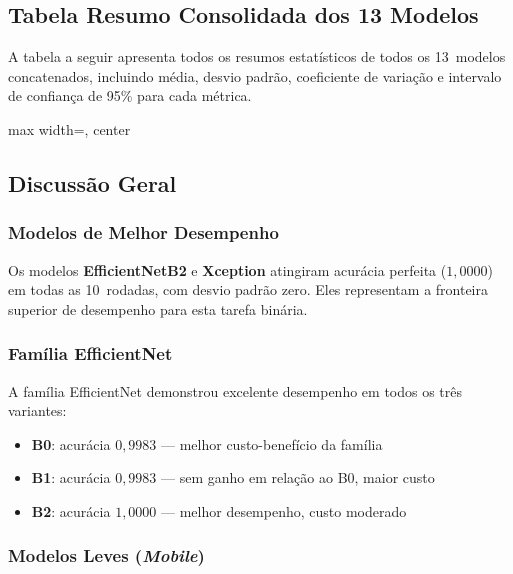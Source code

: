\documentclass[12pt,a4paper]{article}
\begin{document}
\subsection{Tabela Resumo Consolidada dos 13 Modelos}

A tabela a seguir apresenta todos os resumos estatísticos de todos os 13~modelos
concatenados, incluindo média, desvio padrão, coeficiente de variação e
intervalo de confiança de 95\% para cada métrica.

\begin{table}[H]
\centering
\caption{Resumo estatístico consolidado dos 13 modelos}
\begin{adjustbox}{max width=\textwidth, center}

\end{adjustbox}
\end{table}

\subsection{Discussão Geral}

\subsubsection{Modelos de Melhor Desempenho}

Os modelos \textbf{EfficientNetB2} e \textbf{Xception} atingiram acurácia perfeita
($1{,}0000$) em todas as 10~rodadas, com desvio padrão zero. Eles representam
a fronteira superior de desempenho para esta tarefa binária.

\subsubsection{Família EfficientNet}

A família EfficientNet demonstrou excelente desempenho em todos os três variantes:
\begin{itemize}
  \item \textbf{B0}: acurácia $0{,}9983$ --- melhor custo-benefício da família
  \item \textbf{B1}: acurácia $0{,}9983$ --- sem ganho em relação ao B0, maior custo
  \item \textbf{B2}: acurácia $1{,}0000$ --- melhor desempenho, custo moderado
\end{itemize}

\subsubsection{Modelos Leves (\textit{Mobile})}
\end{document}

